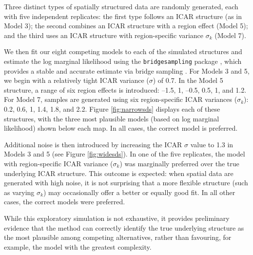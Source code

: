 \documentclass[webpdf,large,contemporary,namedate]{oup-authoring-template}
\theoremstyle{thmstyleone}
\theoremstyle{thmstyletwo}
\theoremstyle{thmstylethree}
\begin{document}
Three distinct types of spatially structured data are randomly
generated, each with five independent replicates: the first type follows
an ICAR structure (as in Model 3); the second combines an ICAR structure
with a region effect (Model 5); and the third uses an ICAR structure
with region-specific variance \(\sigma_k\) (Model 7).

We then fit our eight competing models to each of the simulated
structures and estimate the log marginal likelihood using the
\texttt{bridgesampling} package \citep{Gronau2017}, which provides a
stable and accurate estimate via bridge sampling
\citep{meng1996simulating}. For Models 3 and 5, we begin with a
relatively tight ICAR variance (\(\sigma\)) of 0.7. In the Model 5
structure, a range of six region effects is introduced: --1.5, 1, --0.5,
0.5, 1, and 1.2. For Model 7, samples are generated using six
region-specific ICAR variances (\(\sigma_k\)): 0.2, 0.6, 1, 1.4, 1.8,
and 2.2. Figure \ref{fig:narrowsds} displays each of these structures,
with the three most plausible models (based on log marginal likelihood)
shown below each map. In all cases, the correct model is preferred.

Additional noise is then introduced by increasing the ICAR \(\sigma\)
value to 1.3 in Models 3 and 5 (see Figure \ref{fig:widesds}). In one of
the five replicates, the model with region-specific ICAR variance
(\(\sigma_k\)) was marginally preferred over the true underlying ICAR
structure. This outcome is expected: when spatial data are generated
with high noise, it is not surprising that a more flexible structure
(such as varying \(\sigma_k\)) may occasionally offer a better or
equally good fit. In all other cases, the correct models were preferred.

While this exploratory simulation is not exhaustive, it provides
preliminary evidence that the method can correctly identify the true
underlying structure as the most plausible among competing alternatives,
rather than favouring, for example, the model with the greatest
complexity.
\end{document}

